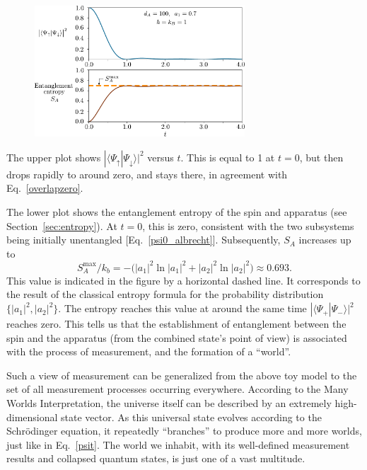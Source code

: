 \documentclass[pra,12pt]{revtex4-2}
\begin{document}
\begin{figure}[h]
  \centering\includegraphics[width=0.7\textwidth]{decoherence}
\end{figure}

The upper plot shows $|\langle\Psi_\uparrow|\Psi_\downarrow\rangle|^2$
versus $t$.  This is equal to 1 at $t = 0$, but then drops rapidly to
around zero, and stays there, in agreement with
Eq.~\eqref{overlapzero}.

The lower plot shows the entanglement entropy of the spin and
apparatus (see Section~\ref{sec:entropy}).  At $t = 0$, this is zero,
consistent with the two subsystems being initially unentangled
[Eq.~\eqref{psi0_albrecht}].  Subsequently, $S_A$ increases up to
\begin{equation}
  S_A^{\mathrm{max}}/k_b = - \Big( |a_1|^2 \ln|a_1|^2 + |a_2|^2\ln|a_2|^2 \Big) \approx 0.693.
\end{equation}
This value is indicated in the figure by a horizontal dashed line.  It
corresponds to the result of the classical entropy formula for the
probability distribution $\{|a_1|^2,|a_2|^2\}$.  The entropy reaches
this value at around the same time $|\langle\Psi_+|\Psi_-\rangle|^2$
reaches zero.  This tells us that the establishment of entanglement
between the spin and the apparatus (from the combined state's point of
view) is associated with the process of measurement, and the formation
of a ``world''.

Such a view of measurement can be generalized from the above toy model
to the set of all measurement processes occurring everywhere.
According to the Many Worlds Interpretation, the universe itself can
be described by an extremely high-dimensional state vector.  As this
universal state evolves according to the Schr\"odinger equation, it
repeatedly ``branches'' to produce more and more worlds, just like in
Eq.~\eqref{psit}.  The world we inhabit, with its well-defined
measurement results and collapsed quantum states, is just one of a
vast multitude.
\end{document}

